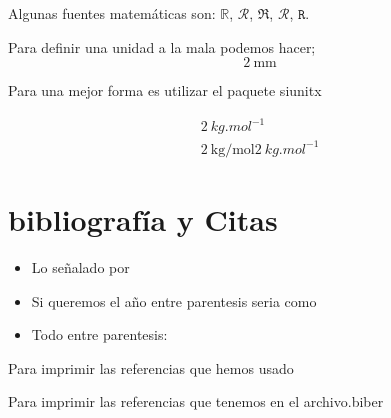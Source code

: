 \documentclass[12pt, letterpaper]{article}
\begin{document}
Algunas fuentes matemáticas son: $\mathbb{R}$, $\mathscr{R}$, $\mathfrak{R}$, $\mathcal{R}$, $\mathtt{R}$.

\newpage

Para definir una unidad a la mala podemos hacer;
\begin{equation}
    2 \ \text{mm}
\end{equation}

Para una mejor forma es utilizar el paquete siunitx

\begin{gather}
    2 \ \unit{kg.mol^{-1}} \\
    2 \ \unit{\kilogram\per\mole}
    \qty{2}{kg.mol^{-1}} %
\end{gather}
\section{bibliografía y Citas}

\begin{itemize}
    \item Lo señalado por \cite{negusLinuxBible2015}
    \item Si queremos el año entre parentesis seria como \citet{negusLinuxBible2015}
    \item Todo entre parentesis: \citep{negusLinuxBible2015}
\end{itemize}

Para imprimir las referencias que hemos usado 

\printbibliography

Para imprimir las referencias que tenemos en el archivo.biber

\nocite{*}
\end{document}
